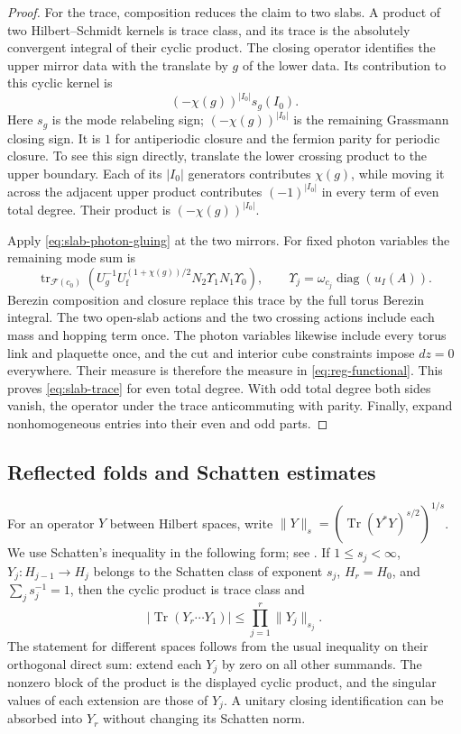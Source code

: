 \documentclass[11pt,letterpaper,reqno]{amsart}
\DeclareMathOperator{\tr}{tr}
\DeclareMathOperator{\diag}{diag}
\begin{document}
\begin{proof}
For the trace, composition reduces the claim to two slabs. A product
of two Hilbert--Schmidt kernels is trace class, and its trace is the
absolutely convergent integral of their cyclic product. The closing
operator identifies the upper mirror data with the translate by $g$
of the lower data. Its contribution to this cyclic kernel is
\[
 (-\chi(g))^{|I_0|}s_g(I_0).
\]
Here $s_g$ is the mode relabeling sign; $(-\chi(g))^{|I_0|}$ is the
remaining Grassmann closing sign. It is $1$ for antiperiodic closure
and the fermion parity for periodic closure. To see this sign directly,
translate the lower crossing product to the upper boundary. Each of
its $|I_0|$ generators contributes $\chi(g)$, while moving it across
the adjacent upper product contributes $(-1)^{|I_0|}$ in every term
of even total degree. Their product is $(-\chi(g))^{|I_0|}$.

Apply \eqref{eq:slab-photon-gluing} at the two mirrors. For fixed
photon variables the remaining mode sum is
\[
 \tr_{\mathcal F(c_0)}
    (U_g^{-1}U_{\mathrm f}^{(1+\chi(g))/2}
                       N_2\Upsilon_1N_1\Upsilon_0),
 \qquad \Upsilon_j=\omega_{c_j}\diag(u_I(A)).
\]
Berezin composition and closure replace this trace by the full torus
Berezin integral. The two open-slab actions and the two crossing
actions include each mass and hopping term once. The photon variables
likewise include every torus link and plaquette once, and the cut and
interior cube constraints impose $dz=0$ everywhere. Their measure is
therefore the measure in \eqref{eq:reg-functional}. This proves
\eqref{eq:slab-trace} for even total degree. With odd total degree both
sides vanish, the operator under the trace anticommuting with parity.
Finally, expand nonhomogeneous entries into their even and odd parts.
\end{proof}

\subsection{Reflected folds and Schatten estimates}\label{subsec:slab-folds}

For an operator $Y$ between Hilbert spaces, write
$\|Y\|_s=(\operatorname{Tr}(Y^*Y)^{s/2})^{1/s}$. We use Schatten's
inequality in the following form; see \cite[slides~55--57]{PongeSchatten2025}. If $1\le s_j<\infty$,
$Y_j:H_{j-1}\to H_j$ belongs to the Schatten class of exponent $s_j$,
$H_r=H_0$, and $\sum_js_j^{-1}=1$, then the cyclic product is trace
class and
\begin{equation}\label{eq:slab-schatten-holder}
 |\operatorname{Tr}(Y_r\cdots Y_1)|
                \le\prod_{j=1}^r\|Y_j\|_{s_j}.
\end{equation}
The statement for different spaces follows from the usual inequality
on their orthogonal direct sum: extend each $Y_j$ by zero on all other
summands. The nonzero block of the product is the displayed cyclic
product, and the singular values of each extension are those of $Y_j$.
A unitary closing identification can be absorbed into $Y_r$ without
changing its Schatten norm.
\end{document}

